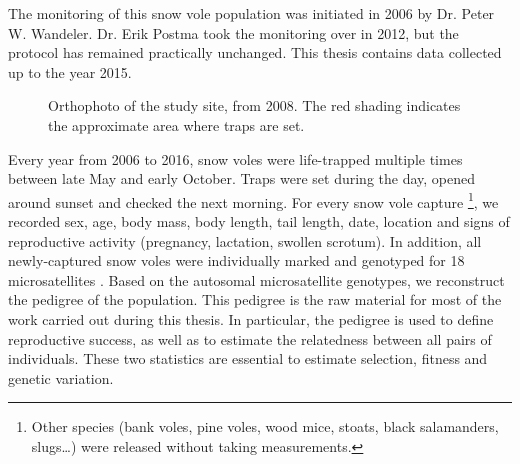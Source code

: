 The monitoring of this snow vole population was initiated in 2006 by Dr. Peter W. Wandeler. Dr. Erik Postma took the monitoring over in 2012, but the protocol has remained practically unchanged. This thesis contains data collected up to the year 2015.
\begin{figure}[ht]
	\caption{Orthophoto of the study site, from 2008. The red shading indicates the approximate area where traps are set.}
	\label{fig:fieldarea}
\end{figure}
Every year from 2006 to 2016, snow voles were life-trapped multiple times between late May and early October. Traps were set during the day, opened around sunset and checked the next morning. 
For every snow vole capture \footnote{Other species (bank voles, pine voles, wood mice, stoats, black salamanders, slugs\dots) were released without taking measurements.}, we recorded sex, age, body mass, body length, tail length, date, location and signs of reproductive activity (pregnancy, lactation, swollen scrotum). 
In addition, all newly-captured snow voles were individually marked and genotyped for 18 microsatellites \cite{Wandeler2008}. Based on the autosomal microsatellite genotypes, we reconstruct the pedigree of the population. This pedigree is the raw material for most of the work carried out during this thesis. In particular, the pedigree is used to define reproductive success, as well as to estimate the relatedness between all pairs of individuals. These two statistics are essential to estimate selection, fitness and genetic variation. 


